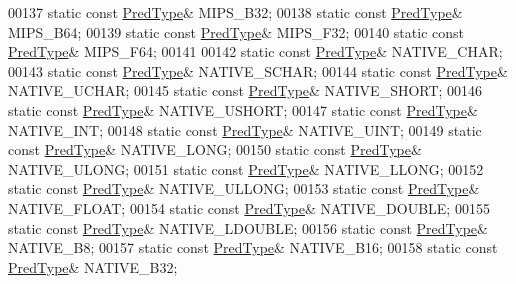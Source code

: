 \begin{DoxyCode}
00137         \textcolor{keyword}{static} \textcolor{keyword}{const} \hyperlink{class_h5_1_1_pred_type}{PredType}& MIPS\_B32;
00138         \textcolor{keyword}{static} \textcolor{keyword}{const} \hyperlink{class_h5_1_1_pred_type}{PredType}& MIPS\_B64;
00139         \textcolor{keyword}{static} \textcolor{keyword}{const} \hyperlink{class_h5_1_1_pred_type}{PredType}& MIPS\_F32;
00140         \textcolor{keyword}{static} \textcolor{keyword}{const} \hyperlink{class_h5_1_1_pred_type}{PredType}& MIPS\_F64;
00141 
00142         \textcolor{keyword}{static} \textcolor{keyword}{const} \hyperlink{class_h5_1_1_pred_type}{PredType}& NATIVE\_CHAR;
00143         \textcolor{keyword}{static} \textcolor{keyword}{const} \hyperlink{class_h5_1_1_pred_type}{PredType}& NATIVE\_SCHAR;
00144         \textcolor{keyword}{static} \textcolor{keyword}{const} \hyperlink{class_h5_1_1_pred_type}{PredType}& NATIVE\_UCHAR;
00145         \textcolor{keyword}{static} \textcolor{keyword}{const} \hyperlink{class_h5_1_1_pred_type}{PredType}& NATIVE\_SHORT;
00146         \textcolor{keyword}{static} \textcolor{keyword}{const} \hyperlink{class_h5_1_1_pred_type}{PredType}& NATIVE\_USHORT;
00147         \textcolor{keyword}{static} \textcolor{keyword}{const} \hyperlink{class_h5_1_1_pred_type}{PredType}& NATIVE\_INT;
00148         \textcolor{keyword}{static} \textcolor{keyword}{const} \hyperlink{class_h5_1_1_pred_type}{PredType}& NATIVE\_UINT;
00149         \textcolor{keyword}{static} \textcolor{keyword}{const} \hyperlink{class_h5_1_1_pred_type}{PredType}& NATIVE\_LONG;
00150         \textcolor{keyword}{static} \textcolor{keyword}{const} \hyperlink{class_h5_1_1_pred_type}{PredType}& NATIVE\_ULONG;
00151         \textcolor{keyword}{static} \textcolor{keyword}{const} \hyperlink{class_h5_1_1_pred_type}{PredType}& NATIVE\_LLONG;
00152         \textcolor{keyword}{static} \textcolor{keyword}{const} \hyperlink{class_h5_1_1_pred_type}{PredType}& NATIVE\_ULLONG;
00153         \textcolor{keyword}{static} \textcolor{keyword}{const} \hyperlink{class_h5_1_1_pred_type}{PredType}& NATIVE\_FLOAT;
00154         \textcolor{keyword}{static} \textcolor{keyword}{const} \hyperlink{class_h5_1_1_pred_type}{PredType}& NATIVE\_DOUBLE;
00155         \textcolor{keyword}{static} \textcolor{keyword}{const} \hyperlink{class_h5_1_1_pred_type}{PredType}& NATIVE\_LDOUBLE;
00156         \textcolor{keyword}{static} \textcolor{keyword}{const} \hyperlink{class_h5_1_1_pred_type}{PredType}& NATIVE\_B8;
00157         \textcolor{keyword}{static} \textcolor{keyword}{const} \hyperlink{class_h5_1_1_pred_type}{PredType}& NATIVE\_B16;
00158         \textcolor{keyword}{static} \textcolor{keyword}{const} \hyperlink{class_h5_1_1_pred_type}{PredType}& NATIVE\_B32;

\end{DoxyCode}

